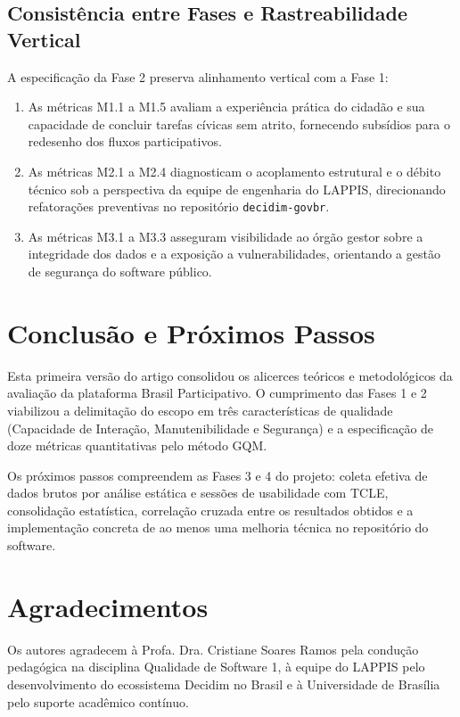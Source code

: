 \documentclass[journal]{IEEEtran}
\begin{document}
\subsection{Consistência entre Fases e Rastreabilidade Vertical}
\label{sec:rastreabilidade}

A especificação da Fase 2 preserva alinhamento vertical com a Fase 1:
\begin{enumerate}
    \item As métricas M1.1 a M1.5 avaliam a experiência prática do cidadão e sua capacidade de concluir tarefas cívicas sem atrito, fornecendo subsídios para o redesenho dos fluxos participativos.
    \item As métricas M2.1 a M2.4 diagnosticam o acoplamento estrutural e o débito técnico sob a perspectiva da equipe de engenharia do LAPPIS, direcionando refatorações preventivas no repositório \texttt{decidim-govbr}.
    \item As métricas M3.1 a M3.3 asseguram visibilidade ao órgão gestor sobre a integridade dos dados e a exposição a vulnerabilidades, orientando a gestão de segurança do software público.
\end{enumerate}

\section{Conclusão e Próximos Passos}
\label{sec:conclusao}

Esta primeira versão do artigo consolidou os alicerces teóricos e metodológicos da avaliação da plataforma Brasil Participativo. O cumprimento das Fases 1 e 2 viabilizou a delimitação do escopo em três características de qualidade (Capacidade de Interação, Manutenibilidade e Segurança) e a especificação de doze métricas quantitativas pelo método GQM.

Os próximos passos compreendem as Fases 3 e 4 do projeto: coleta efetiva de dados brutos por análise estática e sessões de usabilidade com TCLE, consolidação estatística, correlação cruzada entre os resultados obtidos e a implementação concreta de ao menos uma melhoria técnica no repositório do software.

\section*{Agradecimentos}

Os autores agradecem à Profa. Dra. Cristiane Soares Ramos pela condução pedagógica na disciplina Qualidade de Software 1, à equipe do LAPPIS pelo desenvolvimento do ecossistema Decidim no Brasil e à Universidade de Brasília pelo suporte acadêmico contínuo.
\end{document}
